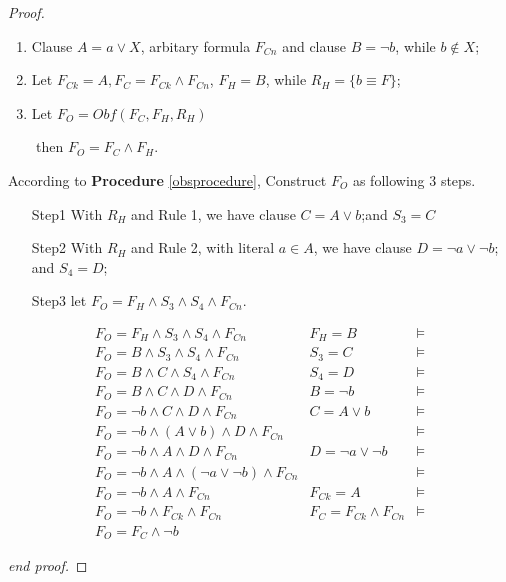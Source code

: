  \begin{proof}

 \begin{enumerate}
 \item Clause $A=a\vee X$, arbitary formula $F_{Cn}$ and clause $B=\neg b$, while $b\notin X$;
 \item Let $F_{Ck} =A, F_C=F_{Ck} \wedge F_{Cn}$, $F_H=B$, while $R_H=\{b\equiv F\}$;
 \item Let $F_O=Obf(F_C,F_H,R_H)$
 \end{enumerate}
  ~~~~then $F_O=F_C\wedge F_H$.

 According to \textbf{Procedure} \ref{obsprocedure}, Construct $F_O$ as following 3 steps.
 \begin{enumerate}
 \item[Step1]
 With $R_H$ and Rule 1,
 we have clause $C=A\vee b$;and $S_3=C$
 \item[Step2]
 With $R_H$ and Rule 2,
 with literal $a\in A$,
 we have clause $D=\neg a\vee \neg b$;
 and $S_4=D$;
 \item[Step3] let $F_O=F_H \wedge S_3\wedge S_4 \wedge F_{Cn} $.
 \end{enumerate}
 \begin{equation}
 \begin{array}{ccc}
 F_O  =  F_H \wedge S_3\wedge S_4\wedge F_{Cn}                      &F_H=B      &\models\\
 F_O  =  B \wedge S_3\wedge S_4\wedge F_{Cn}                        &S_3=C      &\models\\
 F_O  =  B \wedge C\wedge S_4\wedge F_{Cn}                          &S_4=D      &\models\\
 F_O  =  B\wedge C\wedge D\wedge F_{Cn}                             &B=\neg b                    &\models\\
 F_O  =  \neg b\wedge C\wedge D\wedge F_{Cn}                        &C=A\vee b               &\models\\
 F_O  =  \neg b\wedge (A\vee  b) \wedge D\wedge F_{Cn}              &                            &\models\\
 F_O  =  \neg b\wedge A \wedge D\wedge F_{Cn}                       &D=\neg a\vee \neg b     &\models\\
 F_O  =  \neg b\wedge A \wedge (\neg a\vee \neg b)\wedge F_{Cn}     &                            &\models\\
 F_O  =  \neg b\wedge A \wedge F_{Cn}                               &F_{Ck}=A                    &\models\\
 F_O  =  \neg b\wedge F_{Ck}\wedge F_{Cn}                        & F_C=F_{Ck} \wedge F_{Cn}   &\models\\
 F_O  =  F_C\wedge \neg b                                           &   &
 \end{array}
 \end{equation}

 \textit{end proof.}
 \end{proof}

